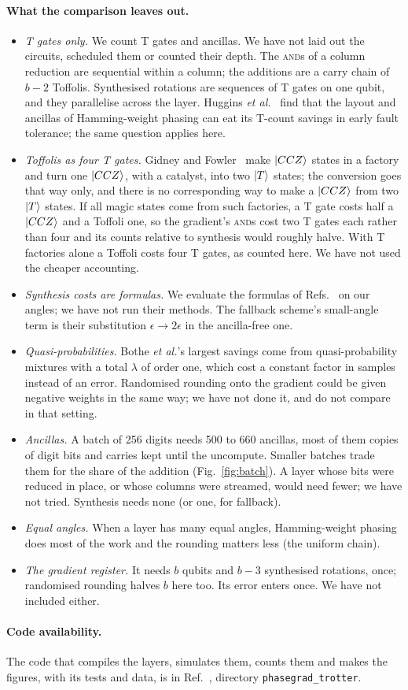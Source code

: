 \documentclass[aps,prx,twocolumn,superscriptaddress,nofootinbib,longbibliography]{revtex4-2}
\theoremstyle{remark}
\newcommand{\AND}{\textup{\textsc{and}}}
\begin{document}
\paragraph*{What the comparison leaves out.}
\begin{itemize}
\item \emph{T gates only.} We count T gates and ancillas. We have not laid out the circuits,
  scheduled them or counted their depth. The \AND{}s of a column reduction are sequential within
  a column; the additions are a carry chain of $b-2$ Toffolis. Synthesised rotations are
  sequences of T gates on one qubit, and they parallelise across the layer. Huggins
  \textit{et al.}~\cite{Huggins2025} find that the layout and ancillas of Hamming-weight phasing
  can eat its T-count savings in early fault tolerance; the same question applies here.
\item \emph{Toffolis as four T gates.} Gidney and Fowler~\cite{Gidney2019} make $\ket{CCZ}$
  states in a factory and turn one $\ket{CCZ}$, with a catalyst, into two $\ket T$ states; the
  conversion goes that way only, and there is no corresponding way to make a $\ket{CCZ}$ from two
  $\ket T$ states. If all magic states come from such factories, a T gate costs half a
  $\ket{CCZ}$ and a Toffoli one, so the gradient's \AND{}s cost two T gates each rather than
  four and its counts relative to synthesis would roughly halve. With T factories alone a
  Toffoli costs four T gates, as counted here. We have not used the cheaper accounting.
\item \emph{Synthesis costs are formulas.} We evaluate the formulas of
  Refs.~\cite{Bothe2026,Kliuchnikov2023} on our angles; we have not run their methods. The
  fallback scheme's small-angle term is their substitution $\epsilon\to2\epsilon$ in the
  ancilla-free one.
\item \emph{Quasi-probabilities.} Bothe \textit{et al.}'s largest savings come from
  quasi-probability mixtures with a total $\lambda$ of order one, which cost a constant factor
  in samples instead of an error. Randomised rounding onto the gradient could be given negative
  weights in the same way; we have not done it, and do not compare in that setting.
\item \emph{Ancillas.} A batch of 256 digits needs 500 to 660 ancillas, most of them copies of
  digit bits and carries kept until the uncompute. Smaller batches trade them for the share of
  the addition (Fig.~\ref{fig:batch}). A layer whose bits were reduced in place, or whose
  columns were streamed, would need fewer; we have not tried. Synthesis needs none (or one, for
  fallback).
\item \emph{Equal angles.} When a layer has many equal angles, Hamming-weight phasing does most
  of the work and the rounding matters less (the uniform chain).
\item \emph{The gradient register.} It needs $b$ qubits and $b-3$ synthesised rotations, once;
  randomised rounding halves $b$ here too. Its error enters once. We have not included either.
\end{itemize}

\paragraph*{Code availability.}
The code that compiles the layers, simulates them, counts them and makes the figures, with its
tests and data, is in Ref.~\cite{code}, directory \texttt{phasegrad\_trotter}.


\end{document}
